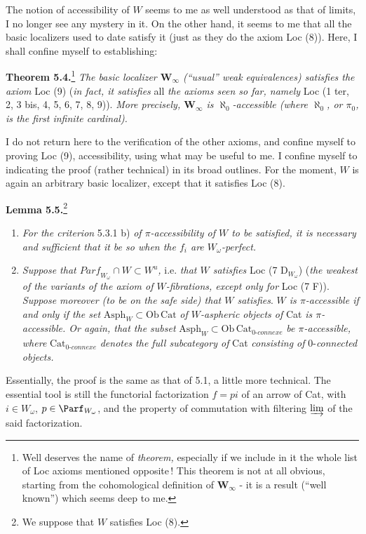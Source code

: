 The notion of accessibility of $W$ seems to me as well understood as that of limits, I no longer see any mystery in it. On the other hand, it seems to me that all the basic localizers used to date satisfy it (just as they do the axiom Loc (8)). Here, I shall confine myself to establishing:


\textbf{Theorem 5.4.}\footnote[39]{Well deserves the name of \textit{theorem,} especially if we include in it the whole list of Loc axioms mentioned opposite\,! This theorem is not at all obvious, starting from the cohomological definition of $\mathbf{W}_\infty$ - it is a result (``well known'') which seems deep to me.} \textit{The basic localizer $\mathbf{W}_\infty$ (``usual'' weak equivalences) satisfies the axiom} Loc (9) (\textit{in fact, it satisfies} all \textit{the axioms seen so far, namely} Loc (1 ter, 2, 3 bis, 4, 5, 6, 7, 8, 9)). \textit{More precisely, $\mathbf{W}_\infty$ is $\aleph_0$-accessible (where $\aleph_0$, or $\pi_0$, is the first infinite cardinal).} %

I do not return here to the verification of the other axioms, and confine myself to proving Loc (9), accessibility, using what may be useful to me. I
confine myself to indicating the proof (rather technical) in its broad outlines. For the moment, $W$ is again an arbitrary basic localizer, except that it satisfies Loc (8).

\textbf{Lemma 5.5.}\footnote[40]{We suppose that $W$ satisfies Loc (8).}
\begin{enumerate}[label={}]
\item[a)] \textit{For the criterion} 5.3.1 b) \textit{of $\pi$-accessibility of $W$ to be satisfied, it is necessary and sufficient that it be so when the $f_i$ are $W_\omega$-perfect.}
\item[b)] \textit{Suppose that $\mathit{Parf}_{W_\omega} \cap W \subset W^u$,} i.e. \textit{that $W$ satisfies} Loc (7 $\mathrm{D}_{W_\omega}$) (\textit{the weakest of the variants of the axiom of $W$-fibrations, except only for} Loc (7 F)). \textit{Suppose moreover (to be on the safe side) that $W$ satisfies}. \textit{$W$ is $\pi$-accessible if and only if the set} $\mathrm{Asph}_W \subset \mathrm{Ob}\,\mathrm{Cat}$ \textit{of $W$-aspheric objects of} Cat \textit{is $\pi$-accessible. Or again, that the subset} $\mathrm{Asph}_W \subset \mathrm{Ob}\,\mathrm{Cat}_{\textit{0-connexe}}$ \textit{be $\pi$-accessible, where} $\mathrm{Cat}_{\textit{0-connexe}}$ \textit{denotes the full subcategory of} Cat \textit{consisting of} 0-\textit{connected objects.}
\end{enumerate}
Essentially, the proof is the same as that of 5.1, a little more technical. The essential tool is still the functorial factorization $f = pi$ of an arrow of Cat, with $i \in W_\omega$, $p \in \Parf_{W_\omega}$, and the property of
commutation with filtering $\varinjlim$ of the said factorization.

